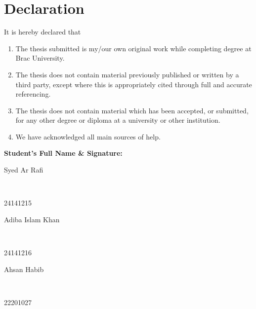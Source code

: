 \newcommand*\wildcard[2][6cm]{\vspace{2cm}\parbox{#1}{\hrulefill\par#2}} 


\section*{Declaration}

It is hereby declared that

\begin{enumerate} %
  \item The thesis submitted is my/our own original work while completing degree at Brac University.
  \item The thesis does not contain material previously published or written by a third party, except where this is appropriately cited through full and accurate referencing.
  \item The thesis does not contain material which has been accepted, or submitted, for any other degree or diploma at a university or other institution.
  \item We have acknowledged all main sources of help.
\end{enumerate}

\vspace{1cm}
\textbf{Student’s Full Name \& Signature:} %

\begingroup

    \begin{center}
        \wildcard{\centerline{Syed Ar Rafi} ~\\ \centerline{24141215}} %
        \hspace{2cm} %
        \wildcard{\centerline{Adiba Islam Khan} ~\\ \centerline{24141216} }
        \wildcard{\centerline{Ahsan Habib} ~\\ \centerline{22201027} }
        \hspace{2cm}
    \end{center}

\endgroup


\pagebreak





